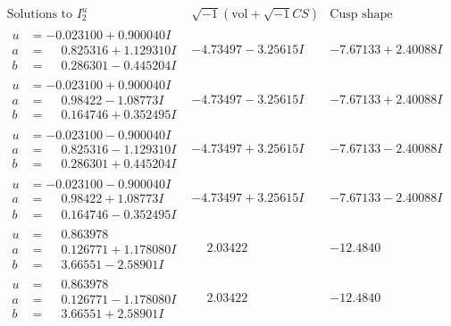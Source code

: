 \documentclass[1p]{elsarticle_modified}
\theoremstyle{definition}
\newcommand{\I}{\sqrt{-1}}
\begin{document}
$$\begin{array}{c|c|c}  
\text{Solutions to }I^u_{2}& \I (\text{vol} + \sqrt{-1}CS) & \text{Cusp shape}\\
 \hline 
\begin{aligned}
u &= -0.023100 + 0.900040 I \\
a &= \phantom{-}0.825316 + 1.129310 I \\
b &= \phantom{-}0.286301 - 0.445204 I\end{aligned}
 & -4.73497 - 3.25615 I & -7.67133 + 2.40088 I \\ \hline\begin{aligned}
u &= -0.023100 + 0.900040 I \\
a &= \phantom{-}0.98422 - 1.08773 I \\
b &= \phantom{-}0.164746 + 0.352495 I\end{aligned}
 & -4.73497 - 3.25615 I & -7.67133 + 2.40088 I \\ \hline\begin{aligned}
u &= -0.023100 - 0.900040 I \\
a &= \phantom{-}0.825316 - 1.129310 I \\
b &= \phantom{-}0.286301 + 0.445204 I\end{aligned}
 & -4.73497 + 3.25615 I & -7.67133 - 2.40088 I \\ \hline\begin{aligned}
u &= -0.023100 - 0.900040 I \\
a &= \phantom{-}0.98422 + 1.08773 I \\
b &= \phantom{-}0.164746 - 0.352495 I\end{aligned}
 & -4.73497 + 3.25615 I & -7.67133 - 2.40088 I \\ \hline\begin{aligned}
u &= \phantom{-}0.863978\phantom{ +0.000000I} \\
a &= \phantom{-}0.126771 + 1.178080 I \\
b &= \phantom{-}3.66551 - 2.58901 I\end{aligned}
 & \phantom{-}2.03422\phantom{ +0.000000I} & -12.4840\phantom{ +0.000000I} \\ \hline\begin{aligned}
u &= \phantom{-}0.863978\phantom{ +0.000000I} \\
a &= \phantom{-}0.126771 - 1.178080 I \\
b &= \phantom{-}3.66551 + 2.58901 I\end{aligned}
 & \phantom{-}2.03422\phantom{ +0.000000I} & -12.4840\phantom{ +0.000000I} \\ \hline\begin{aligned}

\end{aligned}
\end{array}$$
\end{document}
